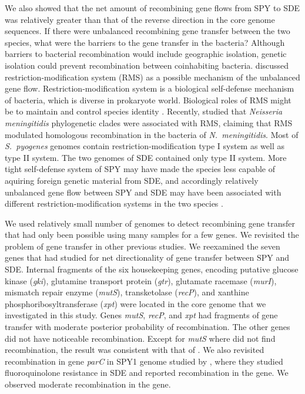 \documentclass[english]{article}
\begin{document}
We also showed that the net amount of recombining gene flows from SPY to SDE was
relatively greater than that of the reverse direction in the core genome
sequences.  If there were unbalanced recombining gene transfer between the two
species, what were the barriers \citep{Thomas2005} to the gene transfer in the
bacteria? Although barriers to bacterial recombination would include geographic
isolation, genetic isolation could prevent recombination between coinhabiting
bacteria.  \citet{Kalia2001} discussed restriction-modification system (RMS) as
a possible mechanism of the unbalanced gene flow.  Restriction-modification
system is a biological self-defense mechanism of bacteria, which is diverse in
prokaryote world.  Biological roles of RMS might be to maintain and control
species identity \citep{Jeltsch2003}.  Recently, \citet{Budroni2011a} studied
that \textit{Neisseria meningitidis} phylogenetic clades were associated with
RMS, claiming that RMS modulated homologous recombination in the bacteria of
\textit{N.\ meningitidis}.  Most of \textit{S.\ pyogenes} genomes contain
restriction-modification type I system as well as type II system. The two
genomes of SDE contained only type II system. More tight self-defense system of
SPY may have made the species less capable of aquiring foreign genetic material
from SDE, and accordingly relatively unbalanced gene flow between SPY and SDE
may have been associated with different restriction-modification systems in the
two species \citep{Kalia2001}.  

We used relatively small number of genomes to detect recombining gene transfer
that had only been possible using many samples for a few genes. We revisited the
problem of gene transfer in other previous studies.  We reexamined the seven
genes that \citet{Kalia2001} had studied for net directionality of gene transfer
between SPY and SDE.  Internal fragments of the six housekeeping genes, encoding
putative glucose kinase (\textit{gki}), glutamine transport protein
(\textit{gtr}), glutamate racemase (\textit{murI}), mismatch repair enzyme
(\textit{mutS}), transketolase (\textit{recP}), and xanthine
phosphoribosyltransferase (\textit{xpt}) were located in the core genome that we
investigated in this study.  Genes \textit{mutS}, \textit{recP}, and
\textit{xpt} had fragments of gene transfer with moderate posterior probability
of recombination. The other genes did not have noticeable recombination. Except
for \textit{mutS} where \citet{Kalia2001} did not find recombination, the result
was consistent with that of \citet{Kalia2001}.  We also revisited recombination
in gene \textit{parC} in SPY1 genome studied by \citet{Pinho2010}, where they
studied fluoroquinolone resistance in SDE and reported recombination in the
gene. We observed moderate recombination in the gene. 
\end{document}
